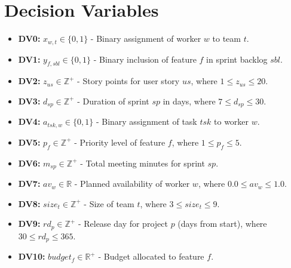 \documentclass[11pt]{article}
\begin{document}
\section{Decision Variables}
\begin{itemize}
    \item \textbf{DV0:} $x_{w,t} \in \{0, 1\}$ - Binary assignment of worker $w$ to team $t$.
    \item \textbf{DV1:} $y_{f,sbl} \in \{0, 1\}$ - Binary inclusion of feature $f$ in sprint backlog $sbl$.
    \item \textbf{DV2:} $z_{us} \in \mathbb{Z}^+$ - Story points for user story $us$, where $1 \leq z_{us} \leq 20$.
    \item \textbf{DV3:} $d_{sp} \in \mathbb{Z}^+$ - Duration of sprint $sp$ in days, where $7 \leq d_{sp} \leq 30$.
    \item \textbf{DV4:} $a_{tsk,w} \in \{0, 1\}$ - Binary assignment of task $tsk$ to worker $w$.
    \item \textbf{DV5:} $p_f \in \mathbb{Z}^+$ - Priority level of feature $f$, where $1 \leq p_f \leq 5$.
    \item \textbf{DV6:} $m_{sp} \in \mathbb{Z}^+$ - Total meeting minutes for sprint $sp$.
    \item \textbf{DV7:} $av_w \in \mathbb{R}$ - Planned availability of worker $w$, where $0.0 \leq av_w \leq 1.0$.
    \item \textbf{DV8:} $size_t \in \mathbb{Z}^+$ - Size of team $t$, where $3 \leq size_t \leq 9$.
    \item \textbf{DV9:} $rd_p \in \mathbb{Z}^+$ - Release day for project $p$ (days from start), where $30 \leq rd_p \leq 365$.
    \item \textbf{DV10:} $budget_f \in \mathbb{R}^+$ - Budget allocated to feature $f$.
\end{itemize}
\end{document}
